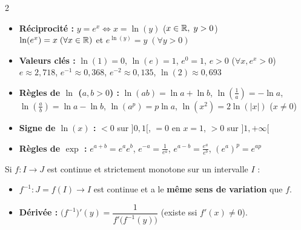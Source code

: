 {\begin{multicols}{2}
\vspace{3pt}
\begin{itemize}[leftmargin=1.2em, itemsep=1.5pt, topsep=2pt]
    \item \textbf{Réciprocité :} $y = e^x \iff x = \ln(y)$ \; ($x \in \mathbb{R},\; y > 0$)\\
    $\ln(e^x) = x \; (\forall x \in \mathbb{R})$ \quad et \quad $e^{\ln(y)} = y \; (\forall y > 0)$
    \item \textbf{Valeurs clés :} $\ln(1) = 0$, \; $\ln(e) = 1$, \; $e^0 = 1$, \; $e > 0$ ($\forall x, e^x > 0$)\\
    $e \approx 2,718$, \; $e^{-1} \approx 0,368$, \; $e^{-2} \approx 0,135$, \; $\ln(2) \approx 0,693$
    \item \textbf{Règles de $\ln$ ($a, b > 0$) :} $\ln(ab) = \ln a + \ln b$, \; $\ln\left(\frac{1}{a}\right) = -\ln a$,\\
    $\ln\left(\frac{a}{b}\right) = \ln a - \ln b$, \; $\ln(a^p) = p\ln a$, \; $\ln(x^2) = 2\ln(|x|)$ ($x \neq 0$)
    \item \textbf{Signe de $\ln(x)$ :} $<0$ sur $]0, 1[$, \; $=0$ en $x=1$, \; $>0$ sur $]1, +\infty[$
    \item \textbf{Règles de $\exp$ :} $e^{a+b} = e^a e^b$, \; $e^{-a} = \frac{1}{e^a}$, \; $e^{a-b} = \frac{e^a}{e^b}$, \; $(e^a)^p = e^{ap}$
\end{itemize}

\vspace{3pt}
Si $f : I \to J$ est continue et strictement monotone sur un intervalle $I$ :
\begin{itemize}[leftmargin=1.2em, itemsep=1.5pt, topsep=2pt]
    \item $f^{-1} : J = f(I) \to I$ est continue et a le \textbf{même sens de variation} que $f$.
    \item \textbf{Dérivée :} $\bigl(f^{-1}\bigr)'(y) = \dfrac{1}{f'\bigl(f^{-1}(y)\bigr)}$ \quad (existe ssi $f'(x) \neq 0$).
\end{itemize}

\columnbreak


\end{multicols}}
